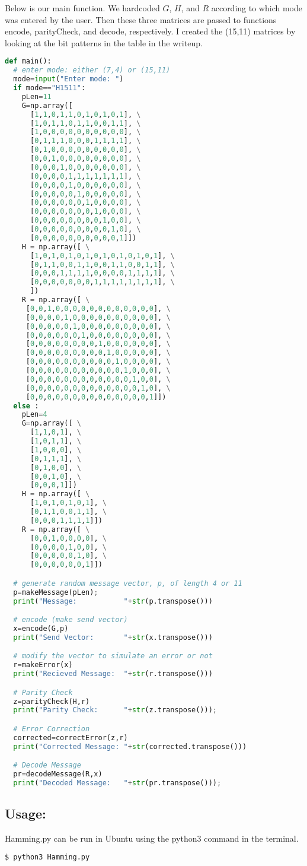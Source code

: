 \documentclass[12pt]{article}
\begin{document}
Below is our main function. We hardcoded $G$, $H$, and $R$ according to 
which mode was entered by the user. Then these three matrices are passed to functions 
encode, parityCheck, and decode, respectively. I created the (15,11) matrices by 
looking at the bit patterns in the table in the writeup.
\begin{lstlisting}[frame=single,language=Python,caption=main \label{code:makeMessage}]
def main():
  # enter mode: either (7,4) or (15,11)
  mode=input("Enter mode: ")
  if mode=="H1511": 
    pLen=11
    G=np.array([
      [1,1,0,1,1,0,1,0,1,0,1], \
      [1,0,1,1,0,1,1,0,0,1,1], \
      [1,0,0,0,0,0,0,0,0,0,0], \
      [0,1,1,1,0,0,0,1,1,1,1], \
      [0,1,0,0,0,0,0,0,0,0,0], \
      [0,0,1,0,0,0,0,0,0,0,0], \
      [0,0,0,1,0,0,0,0,0,0,0], \
      [0,0,0,0,1,1,1,1,1,1,1], \
      [0,0,0,0,1,0,0,0,0,0,0], \
      [0,0,0,0,0,1,0,0,0,0,0], \
      [0,0,0,0,0,0,1,0,0,0,0], \
      [0,0,0,0,0,0,0,1,0,0,0], \
      [0,0,0,0,0,0,0,0,1,0,0], \
      [0,0,0,0,0,0,0,0,0,1,0], \
      [0,0,0,0,0,0,0,0,0,0,1]])
    H = np.array([ \
      [1,0,1,0,1,0,1,0,1,0,1,0,1,0,1], \
      [0,1,1,0,0,1,1,0,0,1,1,0,0,1,1], \
      [0,0,0,1,1,1,1,0,0,0,0,1,1,1,1], \
      [0,0,0,0,0,0,0,1,1,1,1,1,1,1,1], \
      ])
    R = np.array([ \
     [0,0,1,0,0,0,0,0,0,0,0,0,0,0,0], \
     [0,0,0,0,1,0,0,0,0,0,0,0,0,0,0], \
     [0,0,0,0,0,1,0,0,0,0,0,0,0,0,0], \
     [0,0,0,0,0,0,1,0,0,0,0,0,0,0,0], \
     [0,0,0,0,0,0,0,0,1,0,0,0,0,0,0], \
     [0,0,0,0,0,0,0,0,0,1,0,0,0,0,0], \
     [0,0,0,0,0,0,0,0,0,0,1,0,0,0,0], \
     [0,0,0,0,0,0,0,0,0,0,0,1,0,0,0], \
     [0,0,0,0,0,0,0,0,0,0,0,0,1,0,0], \
     [0,0,0,0,0,0,0,0,0,0,0,0,0,1,0], \
     [0,0,0,0,0,0,0,0,0,0,0,0,0,0,1]])
  else : 
    pLen=4
    G=np.array([ \
      [1,1,0,1], \
      [1,0,1,1], \
      [1,0,0,0], \
      [0,1,1,1], \
      [0,1,0,0], \
      [0,0,1,0], \
      [0,0,0,1]])
    H = np.array([ \
      [1,0,1,0,1,0,1], \
      [0,1,1,0,0,1,1], \
      [0,0,0,1,1,1,1]])
    R = np.array([ \
      [0,0,1,0,0,0,0], \
      [0,0,0,0,1,0,0], \
      [0,0,0,0,0,1,0], \
      [0,0,0,0,0,0,1]])

  # generate random message vector, p, of length 4 or 11 
  p=makeMessage(pLen);
  print("Message:           "+str(p.transpose()))

  # encode (make send vector)
  x=encode(G,p)
  print("Send Vector:       "+str(x.transpose()))

  # modify the vector to simulate an error or not
  r=makeError(x)
  print("Recieved Message:  "+str(r.transpose()))

  # Parity Check
  z=parityCheck(H,r)
  print("Parity Check:      "+str(z.transpose()));

  # Error Correction
  corrected=correctError(z,r)
  print("Corrected Message: "+str(corrected.transpose()))

  # Decode Message 
  pr=decodeMessage(R,x)
  print("Decoded Message:   "+str(pr.transpose()));
\end{lstlisting}

\subsection*{Usage:}
Hamming.py can be run in Ubuntu using the python3 command in the terminal. 

\begin{lstlisting}[frame=single,language=Python,caption=main \label{code:makeMessage}]
  $ python3 Hamming.py
\end{lstlisting}
\end{document}
